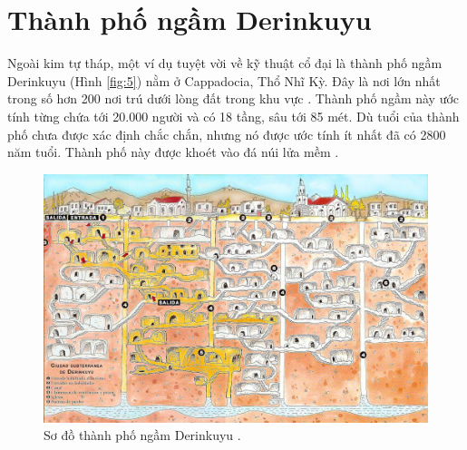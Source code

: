 \documentclass[10pt,twocolumn,letterpaper]{article}
\begin{document}
\section{Thành phố ngầm Derinkuyu}

Ngoài kim tự tháp, một ví dụ tuyệt vời về kỹ thuật cổ đại là thành phố ngầm Derinkuyu (Hình \ref{fig:5}) nằm ở Cappadocia, Thổ Nhĩ Kỳ. Đây là nơi lớn nhất trong số hơn 200 nơi trú dưới lòng đất trong khu vực \cite{54}. Thành phố ngầm này ước tính từng chứa tới 20.000 người và có 18 tầng, sâu tới 85 mét. Dù tuổi của thành phố chưa được xác định chắc chắn, nhưng nó được ước tính ít nhất đã có 2800 năm tuổi. Thành phố này được khoét vào đá núi lửa mềm \cite{52, 53}.

\begin{figure}[t]
\begin{center}
   \includegraphics[width=1\linewidth]{derinkuyu.jpeg}
\end{center}
   \caption{Sơ đồ thành phố ngầm Derinkuyu \cite{56}.}
\label{fig:5}
\label{fig:onecol}
\end{figure}
\end{document}
